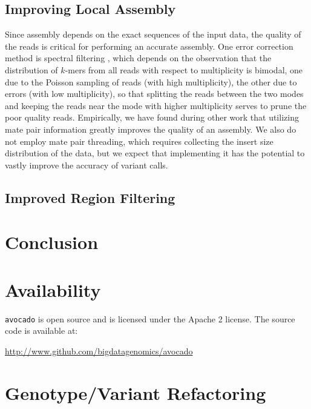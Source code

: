 \documentclass{acm_proc_article-sp}
\begin{document}
\subsection{Improving Local Assembly}
\label{sec:improving-local-assembly}

Since assembly depends on the exact sequences of the input data, the quality of
the reads is critical for performing an accurate assembly.
One error correction method is spectral filtering \cite{pevzner01}, which depends
on the observation that the distribution of $k$-mers from all reads with respect to
multiplicity is bimodal, one due to the Poisson sampling of reads (with high
multiplicity), the other due to errors (with low multiplicity), so that splitting
the reads between the two modes and keeping the reads near the mode with higher
multiplicity serves to prune the poor quality reads.
Empirically, we have found during other work that utilizing mate pair
information greatly improves the quality of an assembly. %
We also do not employ mate pair threading, which requires collecting the
insert size distribution of the data, but we expect that implementing it has
the potential to vastly improve the accuracy of variant calls.

\subsection{Improved Region Filtering}
\label{sec:improved-filtering}

\section{Conclusion}
\label{sec:conclusion}

\appendix

\section{Availability}
\label{sec:availability}

\texttt{avocado} is open source and is licensed under the Apache 2 license. The source code is available at:

\url{http://www.github.com/bigdatagenomics/avocado}

\section{Genotype/Variant Refactoring}
\label{sec:genotype-variant-refactoring}
\end{document}
